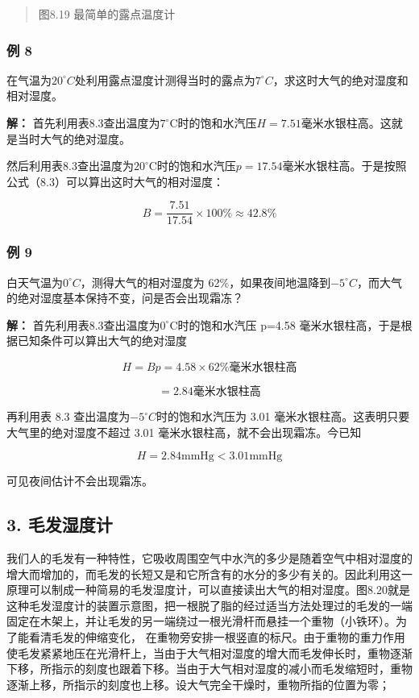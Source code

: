\begin{quote}
图8.19 最简单的露点温度计
\end{quote}

\subsubsection{例 8}\label{ux4f8b-8-3}

在气温为\(20^{\circ}C\)处利用露点湿度计测得当时的露点为\(7^{\circ}C\)，求这时大气的绝对湿度和相对湿度。

\textbf{解：}
首先利用表8.3查出温度为\(7^{\circ} \mathrm{C}\)时的饱和水汽压\(H = 7.51\)毫米水银柱高。这就是当时大气的绝对湿度。

然后利用表8.3查出温度为\(20^{\circ}\mathrm{C}\)时的饱和水汽压\(p = 17.54\)毫米水银柱高。于是按照公式（8.3）可以算出这时大气的相对湿度：

\[
B = \frac {7.51}{17.54} \times 100 \% \approx 42.8 \%
\]

\subsubsection{例 9}\label{ux4f8b-9-2}

白天气温为\(0^{\circ}C\)，测得大气的相对湿度为
62\%，如果夜间地温降到\(-5^{\circ}C\)，而大气的绝对湿度基本保持不变，问是否会出现霜冻？

\textbf{解：}
首先利用表8.3查出温度为\(0^{\circ} \mathrm{C}\)时的饱和水汽压 p=4.58
毫米水银柱高，于是根据已知条件可以算出大气的绝对湿度

\[
H = B p = 4.58 \times 62 \% \text{毫米水银柱高}
\]

\[
= 2.84 \text{毫米水银柱高}
\]

再利用表 8.3 查出温度为\(-5^{\circ}C\)时的饱和水汽压为 3.01
毫米水银柱高。这表明只要大气里的绝对湿度不超过 3.01
毫米水银柱高，就不会出现霜冻。今已知

\[
H = 2.84 \mathrm{mmHg} <   3.01 \mathrm{mmHg}
\]

可见夜间估计不会出现霜冻。

\subsection{3. 毛发湿度计}\label{ux6bdbux53d1ux6e7fux5ea6ux8ba1}

我们人的毛发有一种特性，它吸收周围空气中水汽的多少是随着空气中相对湿度的增大而增加的，而毛发的长短又是和它所含有的水分的多少有关的。因此利用这一原理可以制成一种简易的毛发湿度计，可以直接读出大气的相对湿度。图8.20就是这种毛发湿度计的装置示意图，把一根脱了脂的经过适当方法处理过的毛发的一端固定在木架上，并让毛发的另一端绕过一根光滑杆而悬挂一个重物（小铁环）。为了能看清毛发的伸缩变化，
在重物旁安排一根竖直的标尺。由于重物的重力作用使毛发紧紧地压在光滑杆上，当由于大气相对湿度的增大而毛发伸长时，重物逐渐下移，所指示的刻度也跟着下移。当由于大气相对湿度的减小而毛发缩短时，重物逐渐上移，所指示的刻度也上移。设大气完全干燥时，重物所指的位置为零；

